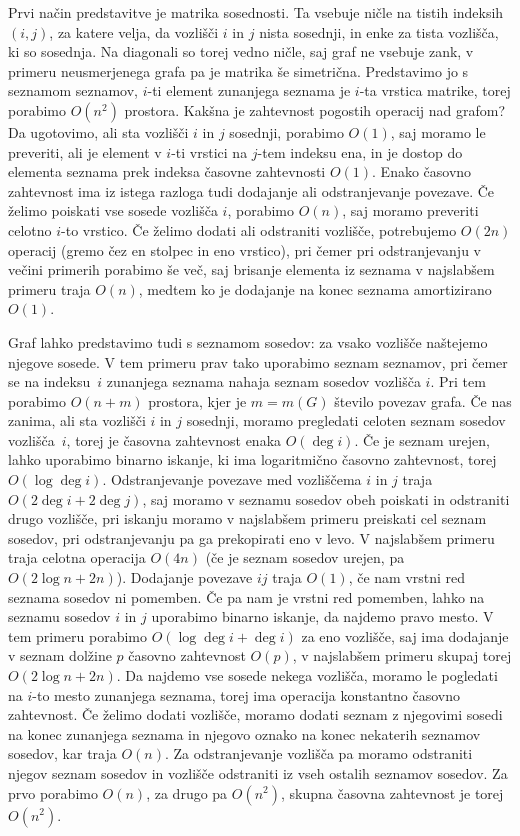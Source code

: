 \documentclass[12pt,a4paper,twoside]{article}
\theoremstyle{definition} %
\theoremstyle{plain} %
\numberwithin{equation}{section}  %
\begin{document}
Prvi način predstavitve je matrika sosednosti. Ta vsebuje ničle na tistih indeksih $(i,j)$, za katere velja, da vozlišči $i$ in $j$ nista sosednji, in enke za tista vozlišča, ki so sosednja. Na diagonali so torej vedno ničle, saj graf ne vsebuje zank, v primeru neusmerjenega grafa pa je matrika še simetrična. Predstavimo jo s seznamom seznamov, $i$-ti element zunanjega seznama je $i$-ta vrstica matrike, torej porabimo $O(n^2)$ prostora. Kakšna je zahtevnost pogostih operacij nad grafom? Da ugotovimo, ali sta vozlišči $i$ in $j$ sosednji, porabimo $O(1)$, saj moramo le preveriti, ali je element v $i$-ti vrstici na $j$-tem indeksu ena, in je dostop do elementa seznama prek indeksa časovne zahtevnosti $O(1)$. Enako časovno zahtevnost ima iz istega razloga tudi dodajanje ali odstranjevanje povezave. Če želimo poiskati vse sosede vozlišča $i$, porabimo $O(n)$, saj moramo preveriti celotno $i$-to vrstico. Če želimo dodati ali odstraniti vozlišče, potrebujemo $O(2n)$ operacij (gremo čez en stolpec in eno vrstico), pri čemer pri odstranjevanju v večini primerih porabimo še več, saj brisanje elementa iz seznama v najslabšem primeru traja $O(n)$, medtem ko je dodajanje na konec seznama amortizirano $O(1)$.

Graf lahko predstavimo tudi s seznamom sosedov: za vsako vozlišče naštejemo njegove sosede. V tem primeru prav tako uporabimo seznam seznamov, pri čemer se na indeksu~$i$ zunanjega seznama nahaja seznam sosedov vozlišča $i$. Pri tem porabimo $O(n+m)$ prostora, kjer je $m = m(G)$ število povezav grafa. Če nas zanima, ali sta vozlišči $i$ in $j$ sosednji, moramo pregledati celoten seznam sosedov vozlišča~$i$, torej je časovna zahtevnost enaka $O(\deg i)$. Če je seznam urejen, lahko uporabimo binarno iskanje, ki ima logaritmično časovno zahtevnost, torej $O(\log \deg i)$. Odstranjevanje povezave med vozliščema $i$ in $j$ traja $O(2 \deg i + 2 \deg j)$, saj moramo v seznamu sosedov obeh poiskati in odstraniti drugo vozlišče, pri iskanju moramo v najslabšem primeru preiskati cel seznam sosedov, pri odstranjevanju pa ga prekopirati eno v levo. V najslabšem primeru traja celotna operacija $O(4n)$ (če je seznam sosedov urejen, pa $O(2\log n + 2n)$). Dodajanje povezave $ij$ traja $O(1)$, če nam vrstni red seznama sosedov ni pomemben. Če pa nam je vrstni red pomemben, lahko na seznamu sosedov $i$ in $j$ uporabimo binarno iskanje, da najdemo pravo mesto. V tem primeru porabimo $O(\log \deg i + \deg i)$ za eno vozlišče, saj ima dodajanje v seznam dolžine $p$ časovno zahtevnost $O(p)$, v najslabšem primeru skupaj torej $O(2 \log n + 2 n)$. Da najdemo vse sosede nekega vozlišča, moramo le pogledati na $i$-to mesto zunanjega seznama, torej ima operacija konstantno časovno zahtevnost. Če želimo dodati vozlišče, moramo dodati seznam z njegovimi sosedi na konec zunanjega seznama in njegovo oznako na konec nekaterih seznamov sosedov, kar traja $O(n)$. Za odstranjevanje vozlišča pa moramo odstraniti njegov seznam sosedov in vozlišče odstraniti iz vseh ostalih seznamov sosedov. Za prvo porabimo $O(n)$, za drugo pa $O(n^2)$, skupna časovna zahtevnost je torej $O(n^2)$.
\end{document}
